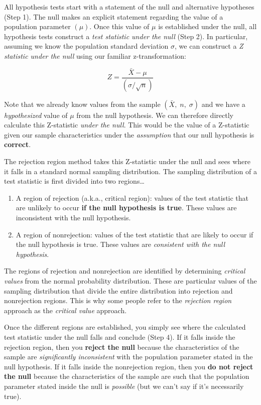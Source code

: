 \documentclass[
]{book}
\begin{document}
All hypothesis tests start with a statement of the null and alternative hypotheses (Step 1). The null makes an explicit statement regarding the value of a population parameter \((\mu)\). Once this value of \(\mu\) is established under the null, all hypothesis tests construct a \emph{test statistic under the null} (Step 2). In particular, assuming we know the population standard deviation \(\sigma\), we can construct a \emph{Z statistic under the null} using our familiar z-transformation:

\[Z = \frac{\bar{X}-\mu}{\left(\sigma / \sqrt{n} \right)}\]

Note that we already know values from the sample \((\bar{X},\;n,\;\sigma)\) and we have a \emph{hypothesized} value of \(\mu\) from the null hypothesis. We can therefore directly calculate this Z-statistic \emph{under the null}. This would be the value of a Z-statistic given our sample characteristics under the \emph{assumption} that our null hypothesis is \textbf{correct}.

The rejection region method takes this Z-statistic under the null and sees where it falls in a standard normal sampling distribution. The sampling distribution of a test statistic is first divided into two regions\ldots{}

\begin{enumerate}
\def\labelenumi{\arabic{enumi}.}
\item
  A region of rejection (a.k.a., critical region): values of the test statistic that are unlikely to occur \textbf{if the null hypothesis is true}. These values are inconsistent with the null hypothesis.
\item
  A region of nonrejection: values of the test statistic that are likely to occur if the null hypothesis is true. These values are \emph{consistent with the null hypothesis}.
\end{enumerate}

The regions of rejection and nonrejection are identified by determining \emph{critical values} from the normal probability distribution. These are particular values of the sampling distribution that divide the entire distribution into rejection and nonrejection regions. This is why some people refer to the \emph{rejection region} approach as the \emph{critical value} approach.

Once the different regions are established, you simply see where the calculated test statistic under the null falls and conclude (Step 4). If it falls inside the rejection region, then you \textbf{reject the null} because the characteristics of the sample are \emph{significantly inconsistent} with the population parameter stated in the null hypothesis. If it falls inside the nonrejection region, then you \textbf{do not reject the null} because the characteristics of the sample are such that the population parameter stated inside the null is \emph{possible} (but we can't say if it's necessarily true).
\end{document}
